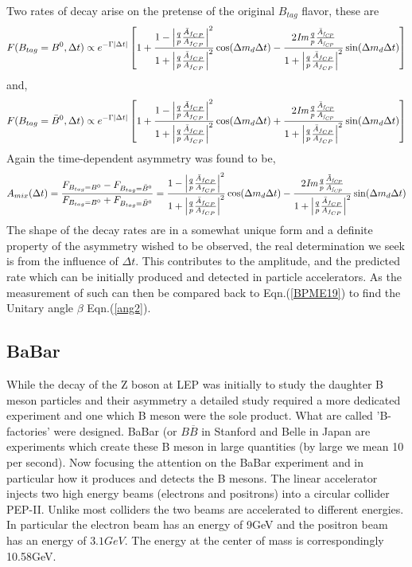 Two rates of decay arise on the pretense of the original $B_{tag}$ flavor, these are
\begin{equation}\label{BPME17}
F(B_{tag}=B^{0},\Delta t) \propto
 e^{-\Gamma |\Delta t|}
\left[1+\frac{1-\left|\frac{q}{p}\frac{\bar{A}_{f_{CP}}}{A_{f_{CP}}}
\right|^{2}}{1+\left|\frac{q}{p}\frac{\bar{A}_{f_{CP}}}{A_{f_{CP}}}\right|^{2}}\cos(\Delta m_{d}\Delta t) - 
\frac{2\it{I}m\frac{q}{p}\frac{\bar{A}_{f_{CP}}}{A_{f_{CP}}}}
{1+\left|\frac{q}{p}\frac{\bar{A}_{f_{CP}}}{A_{f_{CP}}}
\right|^{2}}
\sin(\Delta m_{d} \Delta t)\right]
\end{equation}
and,
\begin{equation}\label{BPME18}
F(B_{tag}=\bar{B}^{0},\Delta t) \propto
 e^{-\Gamma |\Delta t|}
\left[1+\frac{1-\left|\frac{q}{p}\frac{\bar{A}_{f_{CP}}}{A_{f_{CP}}}
\right|^{2}}{1+\left|\frac{q}{p}\frac{\bar{A}_{f_{CP}}}{A_{f_{CP}}}\right|^{2}}\cos(\Delta m_{d}\Delta t) + 
\frac{2\it{I}m\frac{q}{p}\frac{\bar{A}_{f_{CP}}}{A_{f_{CP}}}}
{1+\left|\frac{q}{p}\frac{\bar{A}_{f_{CP}}}{A_{f_{CP}}}
\right|^{2}}
\sin(\Delta m_{d} \Delta t)\right]
\end{equation}
Again the time-dependent asymmetry was found \cite{B6} to be,
\begin{equation}\label{BPME19}
A_{mix}(\Delta t) = \frac{F_{B_{tag}=B^0}-F_{B_{tag}=\bar{B}^0}}{F_{B_{tag}=B^0}+F_{B_{tag}=\bar{B}^0}} = \frac{1-\left|\frac{q}{p}\frac{\bar{A}_{f_{CP}}}{A_{f_{CP}}}
\right|^{2}}{1+\left|\frac{q}{p}\frac{\bar{A}_{f_{CP}}}{A_{f_{CP}}}\right|^{2}}\cos(\Delta m_{d}\Delta t) - 
\frac{2\it{I}m\frac{q}{p}\frac{\bar{A}_{f_{CP}}}{A_{f_{CP}}}}
{1+\left|\frac{q}{p}\frac{\bar{A}_{f_{CP}}}{A_{f_{CP}}}
\right|^{2}}
\sin(\Delta m_{d} \Delta t)
\end{equation}
The shape of the decay rates are in a somewhat unique form and a definite property of the asymmetry wished to be observed, the real determination we seek is from the influence of $\Delta t$. This contributes to the amplitude, and the predicted rate which can be initially produced and detected in particle accelerators. As the measurement of such can then be compared back to Eqn.(\ref{BPME19}) to find the Unitary angle $\beta$ Eqn.(\ref{ang2}).


\subsection{BaBar}
While the decay of the Z boson at LEP was initially to study the daughter B meson particles and their asymmetry a detailed study required a more dedicated experiment and one which B meson were the sole product. What are called 'B-factories' were designed. BaBar (or $B\overline{B}$ in Stanford and Belle in Japan are experiments which create these B meson in large quantities (by large we mean 10 per second). Now focusing the attention on the BaBar experiment and in particular how it produces and detects the B mesons. The linear accelerator injects two high energy beams (electrons and positrons) into a circular collider PEP-II. Unlike most colliders the two beams are accelerated to different energies. In particular the electron beam has an energy of 9GeV and the positron beam has an energy of $3.1GeV$. The energy at the center of mass is correspondingly 10.58GeV.

